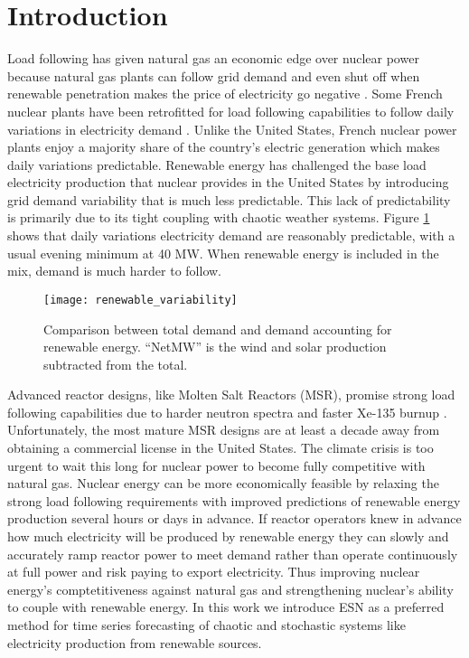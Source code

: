 \section{Introduction}

Load following has given natural gas an economic edge over nuclear power
because natural gas plants can follow grid demand and even shut off when
renewable penetration makes the
price of electricity go negative \cite{keppler_carbon_2011}. Some French nuclear
plants have been retrofitted for load following capabilities to follow daily
variations in electricity demand \cite{lokhov_technical_2011}. Unlike the United
States, French nuclear power plants enjoy a majority share of the country's
electric generation which makes daily variations predictable. Renewable energy
has challenged the base load electricity production that
nuclear provides in the United States by introducing grid demand variability
that is much less predictable. This lack of predictability is primarily due to
its tight coupling with chaotic weather systems. Figure \ref{fig:vre} shows
that daily variations electricity demand are reasonably predictable, with a
usual evening minimum at 40 MW. When renewable energy is included in the mix,
demand is much harder to follow.

\begin{figure}[h]
  \centering
  \texttt{[image: renewable\_variability]}
  \caption{Comparison between total demand and demand accounting for renewable
   energy. ``NetMW'' is the wind and solar production subtracted from the
   total.}
  \label{fig:vre}
\end{figure}

Advanced reactor designs, like Molten Salt
Reactors (MSR), promise strong load following capabilities due to harder
neutron spectra and faster Xe-135 burnup \cite{rykhlevskii_impact_2019}.
Unfortunately, the most mature MSR
designs are at least a decade away from obtaining a commercial license in the
United States. The climate crisis is too urgent to wait this long for nuclear
power to become fully competitive with natural gas.
Nuclear energy can be more economically feasible by relaxing the strong load
following requirements
with improved predictions of renewable energy production several hours or days
in advance. If reactor operators knew in advance how much electricity will be
produced by renewable energy they
can slowly and accurately ramp reactor power to meet demand rather than operate
continuously at full power and risk paying to export electricity. Thus
improving nuclear energy's comptetitiveness against natural gas and
strengthening nuclear's ability to couple with renewable energy.
In this work we introduce \acrfull{ESN} as a preferred method for time
series forecasting of chaotic and stochastic systems like electricity
production from renewable sources.
